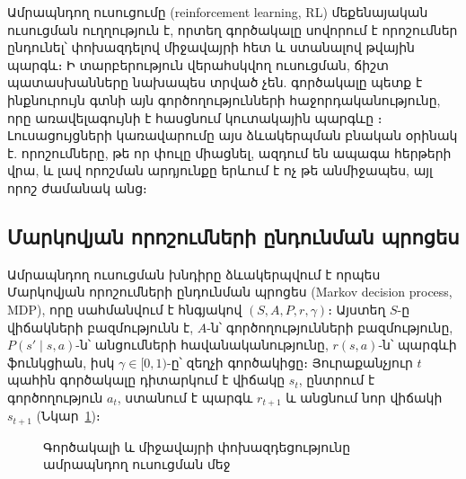 \documentclass[12pt,a4paper]{extreport}
\begin{document}
Ամրապնդող ուսուցումը (reinforcement learning, RL) մեքենայական ուսուցման ուղղություն է, որտեղ գործակալը սովորում է որոշումներ ընդունել՝ փոխազդելով միջավայրի հետ և ստանալով թվային պարգև։ Ի տարբերություն վերահսկվող ուսուցման, ճիշտ պատասխանները նախապես տրված չեն. գործակալը պետք է ինքնուրույն գտնի այն գործողությունների հաջորդականությունը, որը առավելագույնի է հասցնում կուտակային պարգևը \cite{sutton2018}։ Լուսացույցների կառավարումը այս ձևակերպման բնական օրինակ է. որոշումները, թե որ փուլը միացնել, ազդում են ապագա հերթերի վրա, և լավ որոշման արդյունքը երևում է ոչ թե անմիջապես, այլ որոշ ժամանակ անց։

\subsection{Մարկովյան որոշումների ընդունման պրոցես}

Ամրապնդող ուսուցման խնդիրը ձևակերպվում է որպես Մարկովյան որոշումների ընդունման պրոցես (Markov decision process, MDP), որը սահմանվում է հնգյակով $(S, A, P, r, \gamma)$։ Այստեղ $S$-ը վիճակների բազմությունն է, $A$-ն՝ գործողությունների բազմությունը, $P(s' \mid s, a)$-ն՝ անցումների հավանականությունը, $r(s,a)$-ն՝ պարգևի ֆունկցիան, իսկ $\gamma \in [0,1)$-ը՝ զեղչի գործակիցը։ Յուրաքանչյուր $t$ պահին գործակալը դիտարկում է վիճակը $s_t$, ընտրում է գործողություն $a_t$, ստանում է պարգև $r_{t+1}$ և անցնում նոր վիճակի $s_{t+1}$ (Նկար~\ref{fig:rl})։

\begin{figure}[ht]
\centering
{}
\caption{Գործակալի և միջավայրի փոխազդեցությունը ամրապնդող ուսուցման մեջ}
\label{fig:rl}
\end{figure}
\end{document}
